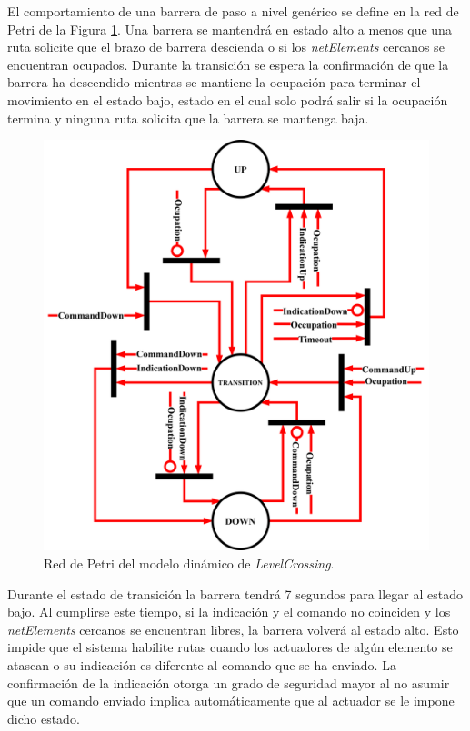 	El comportamiento de una barrera de paso a nivel genérico se define en la red de Petri de la Figura \ref{fig:LCB_Petri}. Una barrera se mantendrá en estado alto a menos que una ruta solicite que el brazo de barrera descienda o si los \textit{netElements} cercanos se encuentran ocupados. Durante la transición se espera la confirmación de que la barrera ha descendido mientras se mantiene la ocupación para terminar el movimiento en el estado bajo, estado en el cual solo podrá salir si la ocupación termina y ninguna ruta solicita que la barrera se mantenga baja.
	
	\begin{figure}[H]
		\centering
		\includegraphics[width=1\textwidth]{Figuras/LCB_petri}
		\centering\caption{Red de Petri del modelo dinámico de \textit{LevelCrossing}.}
		\label{fig:LCB_Petri}
	\end{figure}
	
	Durante el estado de transición la barrera tendrá 7 segundos para llegar al estado bajo. Al cumplirse este tiempo, si la indicación y el comando no coinciden y los \textit{netElements} cercanos se encuentran libres, la barrera volverá al estado alto. Esto impide que el sistema habilite rutas cuando los actuadores de algún elemento se atascan o su indicación es diferente al comando que se ha enviado. La confirmación de la indicación otorga un grado de seguridad mayor al no asumir que un comando enviado implica automáticamente que al actuador se le impone dicho estado.